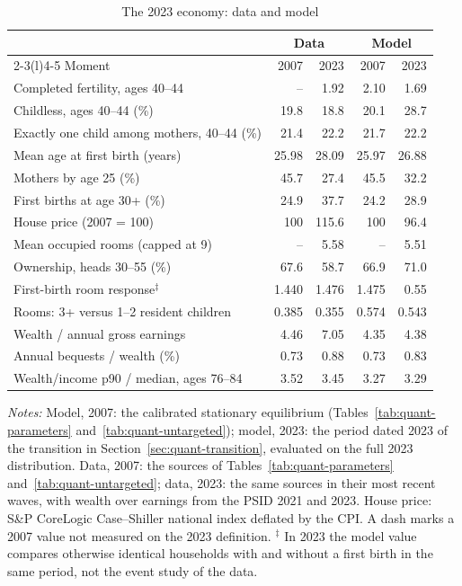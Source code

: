 \begin{table}[t]
\centering
\caption{The 2023 economy: data and model}
\label{tab:quant-2023}
\small
\begin{tabularx}{\textwidth}{@{}X rr @{\hspace{1.5em}} rr@{}}
\toprule
 & \multicolumn{2}{c}{Data} & \multicolumn{2}{c}{Model} \\
\cmidrule(lr){2-3}\cmidrule(l){4-5}
Moment & 2007 & 2023 & 2007 & 2023 \\
\midrule
Completed fertility, ages 40--44 & -- & 1.92 & 2.10 & 1.69 \\
Childless, ages 40--44 (\%) & 19.8 & 18.8 & 20.1 & 28.7 \\
Exactly one child among mothers, 40--44 (\%) & 21.4 & 22.2 & 21.7 & 22.2 \\
Mean age at first birth (years) & 25.98 & 28.09 & 25.97 & 26.88 \\
Mothers by age 25 (\%) & 45.7 & 27.4 & 45.5 & 32.2 \\
First births at age 30+ (\%) & 24.9 & 37.7 & 24.2 & 28.9 \\
\addlinespace
House price (2007 = 100) & 100 & 115.6 & 100 & 96.4 \\
Mean occupied rooms (capped at 9) & -- & 5.58 & -- & 5.51 \\
Ownership, heads 30--55 (\%) & 67.6 & 58.7 & 66.9 & 71.0 \\
First-birth room response$^{\ddagger}$ & 1.440 & 1.476 & 1.475 & 0.55 \\
Rooms: 3+ versus 1--2 resident children & 0.385 & 0.355 & 0.574 & 0.543 \\
\addlinespace
Wealth / annual gross earnings & 4.46 & 7.05 & 4.35 & 4.38 \\
Annual bequests / wealth (\%) & 0.73 & 0.88 & 0.73 & 0.83 \\
Wealth/income p90 / median, ages 76--84 & 3.52 & 3.45 & 3.27 & 3.29 \\
\bottomrule
\end{tabularx}
\par\smallskip
\begin{minipage}{0.95\linewidth}
\footnotesize\textit{Notes:} Model, 2007: the calibrated stationary
equilibrium (Tables~\ref{tab:quant-parameters} and~\ref{tab:quant-untargeted});
model, 2023: the period dated 2023 of the transition in
Section~\ref{sec:quant-transition}, evaluated on the full 2023 distribution.
Data, 2007: the sources of Tables~\ref{tab:quant-parameters}
and~\ref{tab:quant-untargeted}; data, 2023: the same sources in their most
recent waves, with wealth over earnings from the PSID 2021 and 2023. House
price: S\&P CoreLogic Case--Shiller national index deflated by the CPI. A
dash marks a 2007 value not measured on the 2023 definition. $^{\ddagger}$ In
2023 the model value compares otherwise identical households with and
without a first birth in the same period, not the event study of the data.
\end{minipage}
\end{table}
